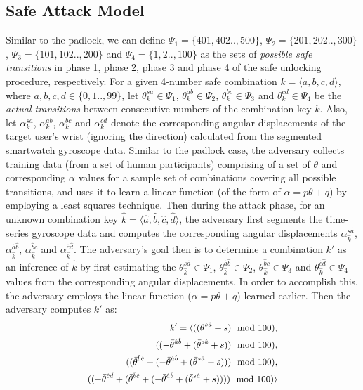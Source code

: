 \documentclass[]{IEEEtran}
\begin{document}
\subsection{Safe Attack Model}
\label{detsafe}
Similar to the padlock, we can define $\Psi_{1}=\{401,402..,500\}$, $\Psi_{2}=\{201,202..,300\}$, $\Psi_{3}=\{101,102..,200\}$ and $\Psi_{4}=\{1,2..,100\}$ as the sets of \emph{possible safe transitions} in phase 1, phase 2, phase 3 and phase 4 of the safe unlocking procedure, respectively.
For a given 4-number safe combination $k=\langle a,b,c,d\rangle $, where $a,b,c,d \in \{0,1..,99\}$, let $\theta^{sa}_k\in \Psi_{1}$, $\theta^{ab}_k\in \Psi_{2}$, $\theta^{bc}_k\in \Psi_{3}$ and $\theta^{cd}_k\in \Psi_{4}$ be the \emph{actual transitions} between consecutive numbers of the combination key $k$.
Also, let $\alpha^{sa}_k$, $\alpha^{ab}_k$, $\alpha^{bc}_k$ and $\alpha^{cd}_k$ denote the corresponding angular displacements of the target user's wrist (ignoring the direction) calculated from the segmented smartwatch gyroscope data.
Similar to the padlock case, the adversary collects training data (from a set of human participants) comprising of a set of $\theta$ and corresponding $\alpha$ values for a sample set of combinations covering all possible transitions, and uses it to learn a linear function (of the form of $\alpha=p\theta+q$) by employing a least squares \cite{york1966least} technique. Then during the attack phase, for an unknown combination key $\hat{k}=\langle \hat{a},\hat{b},\hat{c},\hat{d}\rangle $, the adversary first segments the time-series gyroscope data and computes the corresponding angular displacements $\alpha^{s\hat{a}}_{\hat{k}}$, $\alpha^{\hat{a}\hat{b}}_{\hat{k}}$, $\alpha^{\hat{b}\hat{c}}_{\hat{k}}$ and $\alpha^{\hat{c}\hat{d}}_{\hat{k}}$. 
The adversary's goal then is to determine a combination $k'$ as an inference of $\hat{k}$ by first estimating the $\theta^{s\hat{a}}_{\hat{k}} \in \Psi_{1}$, $\theta^{\hat{a}\hat{b}}_{\hat{k}} \in \Psi_{2}$, $\theta^{\hat{b}\hat{c}}_{\hat{k}} \in \Psi_{3}$ and $\theta^{\hat{c}\hat{d}}_{\hat{k}} \in \Psi_{4}$ values from the corresponding angular displacements. In order to accomplish this, the adversary employs the linear function ($\alpha=p\theta+q$) learned earlier. Then the adversary computes $k'$ as: 
\begin{equation}
\small
\begin{aligned}
k'=\langle ((\bar{\theta}^{s\hat{a}}+s)\mod{100}), \\((-\bar{\theta}^{\hat{a}\hat{b}}+(\bar{\theta}^{s\hat{a}}+s))\mod{100}), \\ ((\bar{\theta}^{\hat{b}\hat{c}}+(-\bar{\theta}^{\hat{a}\hat{b}}+(\bar{\theta}^{s\hat{a}}+s)))\mod{100}), \\ ((-\bar{\theta}^{\hat{c}\hat{d}}+(\bar{\theta}^{\hat{b}\hat{c}}+(-\bar{\theta}^{\hat{a}\hat{b}}+(\bar{\theta}^{s\hat{a}}+s))))\mod{100})\rangle 
\end{aligned}
\label{safekeyformula}
\end{equation}
\end{document}
